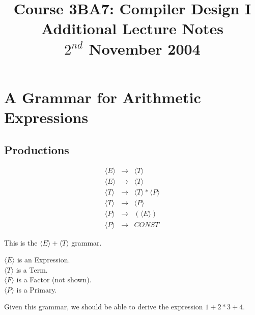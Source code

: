 \documentclass[a4paper,12pt]{article}
\begin{document}
\title{Course 3BA7: Compiler Design I \\ Additional Lecture Notes \\ $2^{nd}$ November 2004}

\maketitle

\section*{A Grammar for Arithmetic Expressions}

\subsection*{Productions}

\begin{eqnarray}
\langle E \rangle		&	\to	&	\langle T \rangle		\\
\langle E \rangle		&	\to	&	\langle T \rangle		\\
\langle T \rangle		&	\to	&	\langle T \rangle \ast \langle P \rangle \\
\langle T \rangle		&	\to	&	\langle P \rangle \\
\langle P \rangle		&	\to	&	\left( \langle E \rangle \right) \\
\langle P \rangle		&	\to	&	CONST
\end{eqnarray}

This is the $\langle E \rangle + \langle T \rangle$ grammar.

$\langle E \rangle$ is an Expression. \\
$\langle T \rangle$ is a Term. \\
$\langle F \rangle$ is a Factor (not shown). \\
$\langle P \rangle$ is a Primary.


Given this grammar, we should be able to derive the expression $1 + 2
\ast 3 + 4$.
\end{document}
